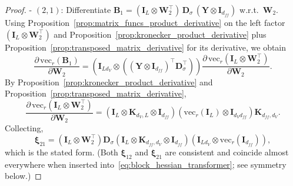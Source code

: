 \documentclass{article}
\begin{document}
\begin{proof}
- $(2,1)$: Differentiate $\mathbf{B}_1 = (\mathbf{I}_L \otimes \mathbf{W}_2^\top)\, \mathbf{D}_\sigma\, (\mathbf{Y} \otimes \mathbf{I}_{d_{ff}})$ w.r.t.\ $\mathbf{W}_2$. Using Proposition~\ref{prop:matrix_funcs_product_derivative} on the left factor $(\mathbf{I}_L \otimes \mathbf{W}_2^\top)$ and Proposition~\ref{prop:kronecker_product_derivative} plus Proposition~\ref{prop:transposed_matrix_derivative} for its derivative, we obtain
\[\frac{\partial\,\mathrm{vec}_r(\mathbf{B}_1)}{\partial \mathbf{W}_2}= \left( \mathbf{I}_{L d_V} \otimes \left( (\mathbf{Y} \otimes \mathbf{I}_{d_{ff}})^\top \mathbf{D}_\sigma^\top \right) \right) \frac{\partial\,\mathrm{vec}_r(\mathbf{I}_L \otimes \mathbf{W}_2^\top)}{\partial \mathbf{W}_2}.\]
By Proposition~\ref{prop:kronecker_product_derivative} and Proposition~\ref{prop:transposed_matrix_derivative},
\[\frac{\partial\,\mathrm{vec}_r(\mathbf{I}_L \otimes \mathbf{W}_2^\top)}{\partial \mathbf{W}_2}= \left( \mathbf{I}_L \otimes \mathbf{K}_{d_V, L} \otimes \mathbf{I}_{d_{ff}} \right) \left( \mathrm{vec}_r(\mathbf{I}_L) \otimes \mathbf{I}_{d_V d_{ff}} \right) \mathbf{K}_{d_{ff}, d_V}.\]
Collecting,
\[\boldsymbol{\xi}_{21} = \left( \mathbf{I}_L \otimes \mathbf{W}_2^\top \right) \mathbf{D}_\sigma \left( \mathbf{I}_L \otimes \mathbf{K}_{d_{ff}, d_V} \otimes \mathbf{I}_{d_{ff}} \right) \left( \mathbf{I}_{L d_V} \otimes \mathrm{vec}_r(\mathbf{I}_{d_{ff}}) \right),\]
which is the stated form. (Both $\boldsymbol{\xi}_{12}$ and $\boldsymbol{\xi}_{21}$ are consistent and coincide almost everywhere when inserted into~\eqref{eq:block_hessian_transformer}; see symmetry below.)


\end{proof}
\end{document}
